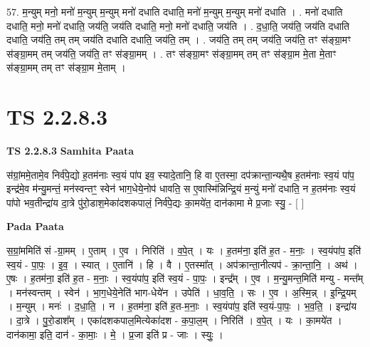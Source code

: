 \documentclass[17pt]{extarticle}
\begin{document}
57. म॒न्युम् मनो॒ मनो॑ म॒न्युम् म॒न्युम् मनो॑ दधाति दधाति॒ मनो॑ म॒न्युम् म॒न्युम् मनो॑ दधाति । . मनो॑ दधाति दधाति॒ मनो॒ मनो॑ दधाति॒ जय॑ति॒ जय॑ति दधाति॒ मनो॒ मनो॑ दधाति॒ जय॑ति । . द॒धा॒ति॒ जय॑ति॒ जय॑ति दधाति दधाति॒ जय॑ति॒ तम् तम् जय॑ति दधाति दधाति॒ जय॑ति॒ तम् । . जय॑ति॒ तम् तम् जय॑ति॒ जय॑ति॒ तꣳ स॑ङ्ग्रा॒मꣳ स॑ङ्ग्रा॒मम् तम् जय॑ति॒ जय॑ति॒ तꣳ स॑ङ्ग्रा॒मम् । . तꣳ स॑ङ्ग्रा॒मꣳ स॑ङ्ग्रा॒मम् तम् तꣳ स॑ङ्ग्रा॒म मे॒ता मे॒ताꣳ स॑ङ्ग्रा॒मम् तम् तꣳ स॑ङ्ग्रा॒म मे॒ताम् । \newline
\pagebreak
{}

\section{ TS 2.2.8.3 }

\textbf{TS 2.2.8.3 } \newline
\textbf{Samhita Paata} \newline

स॑ग्रां॒ममे॒तामे॒व निर्व॑पे॒द्यो ह॒तम॑नाः स्व॒यं पा॑प इव॒ स्यादे॒तानि॒ हि वा ए॒तस्मा॒ दप॑क्रान्ता॒न्यथै॒ष ह॒तम॑नाः स्व॒यं पा॑प॒ इन्द्र॑मे॒व म॑न्यु॒मन्तं॒ मन॑स्वन्तꣳ॒॒ स्वेन॑ भाग॒धेये॒नोप॑ धावति॒ स ए॒वास्मि॑न्निन्द्रि॒यं म॒न्युं मनो॑ दधाति॒ न ह॒तम॑नाः स्व॒यं पा॑पो भव॒तीन्द्रा॑य दा॒त्रे पु॑रो॒डाश॒मेका॑दशकपालं॒ निर्व॑पे॒द्यः का॒मये॑त॒ दान॑कामा मे प्र॒जाः स्यु॒ - [  ] \newline

\textbf{Pada Paata} \newline

स॒ग्रां॒ममिति॑ सं -ग्रा॒मम् । ए॒ताम् । ए॒व । निरिति॑ । व॒पे॒त् । यः । ह॒तम॑ना॒ इति॑ ह॒त - म॒नाः॒ । स्व॒यंपा॑प॒ इति॑ स्व॒यं - पा॒पः॒ । इ॒व॒ । स्यात् । ए॒तानि॑ । हि । वै । ए॒तस्मा᳚त् । अप॑क्रान्ता॒नीत्यप॑ - क्रा॒न्ता॒नि॒ । अथ॑ । ए॒षः । ह॒तम॑ना॒ इति॑ ह॒त - म॒नाः॒ । स्व॒यंपा॑प॒ इति॑ स्व॒यं - पा॒पः॒ । इन्द्र᳚म् । ए॒व । म॒न्यु॒मन्त॒मिति॑ मन्यु - मन्त᳚म् । मन॑स्वन्तम् । स्वेन॑ । भा॒ग॒धेये॒नेति॑ भाग-धेये॑न । उपेति॑ । धा॒व॒ति॒ । सः । ए॒व । अ॒स्मि॒न्न् । इ॒न्द्रि॒यम् । म॒न्युम् । मनः॑ । द॒धा॒ति॒ । न । ह॒तम॑ना॒ इति॑ ह॒त-म॒नाः॒ । स्व॒यंपा॑प॒ इति॑ स्व॒यं-पा॒पः॒ । भ॒व॒ति॒ । इन्द्रा॑य । दा॒त्रे । पु॒रो॒डाश᳚म् । एका॑दशकपाल॒मित्येका॑दश - क॒पा॒ल॒म् । निरिति॑ । व॒पे॒त् । यः । का॒मये॑त । दान॑कामा॒ इति॒ दान॑ - का॒माः॒ । मे॒ । प्र॒जा इति॑ प्र - जाः । स्युः॒ ।  \newline
\end{document}
